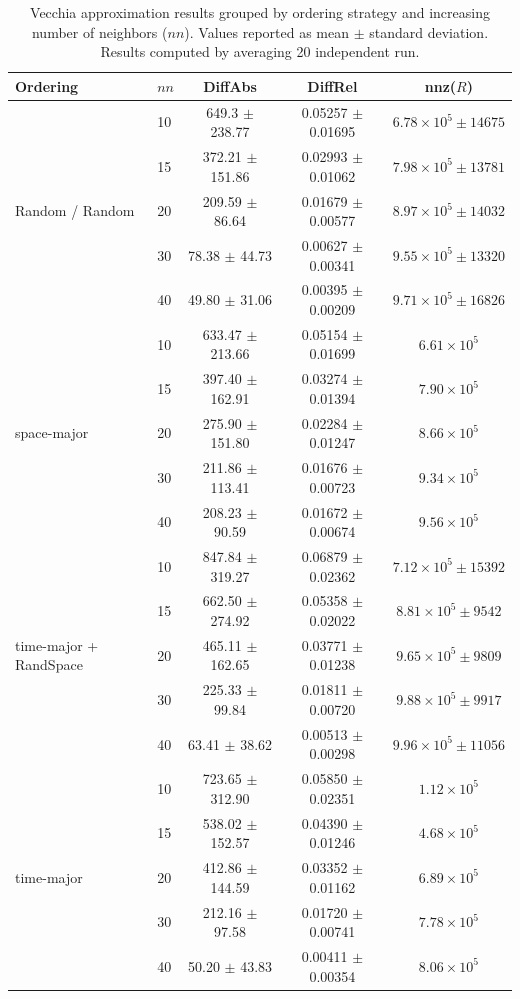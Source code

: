\documentclass[12pt]{article}
\begin{document}
\begin{table}[!htbp]
\centering
\caption{Vecchia approximation results grouped by ordering strategy and increasing number of neighbors ($nn$). Values reported as mean $\pm$ standard deviation. Results computed by averaging 20 independent run.}
\label{tab:OrderingStrategies}
\small
\begin{tabular}{llccc}
\toprule
Ordering & $nn$ & DiffAbs & DiffRel & nnz($R$) \\
\midrule

\multirow{5}{*}{Random / Random}
& 10 & 649.3 $\pm$ 238.77 & 0.05257 $\pm$ 0.01695 & $6.78{\times}10^5 \pm 14675$ \\
& 15 & 372.21 $\pm$ 151.86 & 0.02993 $\pm$ 0.01062 & $7.98{\times}10^5 \pm 13781$ \\
& 20 & 209.59 $\pm$ 86.64 & 0.01679 $\pm$ 0.00577 & $8.97{\times}10^5 \pm 14032$ \\
& 30 & 78.38 $\pm$ 44.73 & 0.00627 $\pm$ 0.00341 & $9.55{\times}10^5 \pm 13320$ \\
& 40 & 49.80 $\pm$ 31.06 & 0.00395 $\pm$ 0.00209 & $9.71{\times}10^5 \pm 16826$ \\
\midrule

\multirow{5}{*}{space-major}
& 10 & 633.47 $\pm$ 213.66 & 0.05154 $\pm$ 0.01699 & $6.61{\times}10^5$ \\
& 15 & 397.40 $\pm$ 162.91 & 0.03274 $\pm$ 0.01394 & $7.90{\times}10^5$ \\
& 20 & 275.90 $\pm$ 151.80 & 0.02284 $\pm$ 0.01247 & $8.66{\times}10^5$ \\
& 30 & 211.86 $\pm$ 113.41 & 0.01676 $\pm$ 0.00723 & $9.34{\times}10^5$ \\
& 40 & 208.23 $\pm$ 90.59 & 0.01672 $\pm$ 0.00674 & $9.56{\times}10^5$ \\
\midrule

\multirow{5}{*}{time-major + RandSpace}
& 10 & 847.84 $\pm$ 319.27 & 0.06879 $\pm$ 0.02362 & $7.12{\times}10^5 \pm 15392$ \\
& 15 & 662.50 $\pm$ 274.92 & 0.05358 $\pm$ 0.02022 & $8.81{\times}10^5 \pm 9542$ \\
& 20 & 465.11 $\pm$ 162.65 & 0.03771 $\pm$ 0.01238 & $9.65{\times}10^5 \pm 9809$ \\
& 30 & 225.33 $\pm$ 99.84 & 0.01811 $\pm$ 0.00720 & $9.88{\times}10^5 \pm 9917$ \\
& 40 & 63.41 $\pm$ 38.62 & 0.00513 $\pm$ 0.00298 & $9.96{\times}10^5 \pm 11056$ \\
\midrule

\multirow{5}{*}{time-major}
& 10 & 723.65 $\pm$ 312.90 & 0.05850 $\pm$ 0.02351 & $1.12{\times}10^5$ \\
& 15 & 538.02 $\pm$ 152.57 & 0.04390 $\pm$ 0.01246 & $4.68{\times}10^5$ \\
& 20 & 412.86 $\pm$ 144.59 & 0.03352 $\pm$ 0.01162 & $6.89{\times}10^5$ \\
& 30 & 212.16 $\pm$ 97.58 & 0.01720 $\pm$ 0.00741 & $7.78{\times}10^5$ \\
& 40 & 50.20 $\pm$ 43.83 & 0.00411 $\pm$ 0.00354 & $8.06{\times}10^5$ \\
\bottomrule
\end{tabular}
\end{table}
\end{document}
